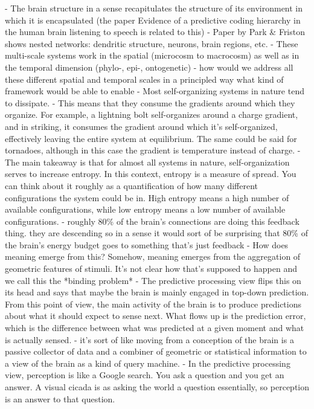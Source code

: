     - The brain structure in a sense recapitulates the structure of its environment in which it is encapsulated
    (the paper Evidence of a predictive coding hierarchy in the human brain listening to speech is related to this)
- Paper by Park \& Friston shows nested networks: dendritic structure, neurons, brain regions, etc. 
- These multi-scale systems work in the spatial (microcosm to macrocosm) as well as in the temporal dimension (phylo-, epi-, ontogenetic)
- how would we address all these different spatial and temporal scales in a principled way what kind of framework would be able to enable
- Most self-organizing systems in nature tend to dissipate. 
- This means that they consume the gradients around which they organize. For example, a lightning bolt self-organizes around a charge gradient, and in striking, it consumes the gradient around which it's self-organized, effectively leaving the entire system at equilibrium. The same could be said for tornadoes, although in this case the gradient is temperature instead of charge.
- The main takeaway is that for almost all systems in nature, self-organization serves to increase entropy. In this context, entropy is a measure of spread. You can think about it roughly as a quantification of how many different configurations the system could be in. High entropy means a high number of available configurations, while low entropy means a low number of available configurations.
- roughly 80\% of the brain's connections are doing this feedback thing. they are descending so in a sense it would sort of be surprising that 80\% of the brain's energy budget goes to something that's just feedback
- How does meaning emerge from this? Somehow, meaning emerges from the aggregation of geometric features of stimuli. It's not clear how that's supposed to happen and we call this the *binding problem*
- The predictive processing view flips this on its head and says that maybe the brain is mainly engaged in top-down prediction. From this point of view, the main activity of the brain is to produce predictions about what it should expect to sense next. What flows up is the prediction error, which is the difference between what was predicted at a given moment and what is actually sensed.
- it's sort of like moving from a conception of the brain is a passive collector of data and a combiner of geometric or statistical information to a view of the brain as a kind of query machine.
- In the predictive processing view, perception is like a Google search. You ask a question and you get an answer. A visual cicada is as asking the world a question essentially, so perception is an answer to that question.
